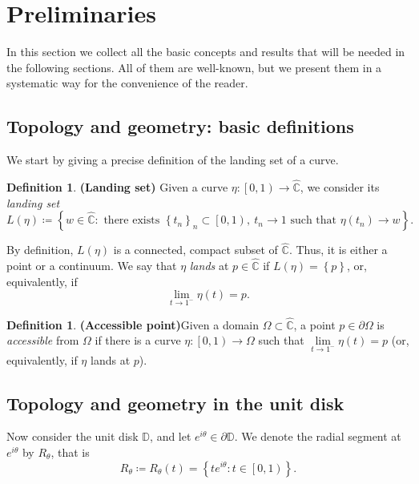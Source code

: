\documentclass[11pt,a4paper,reqno]{amsart}
\theoremstyle{plain}
\theoremstyle{definition}
\newtheorem{defi}[thm]{Definition}
\theoremstyle{plain}
\begin{document}
\section{Preliminaries}\label{sect-preliminaries}


In this section we collect all the basic concepts and results that will be needed in the following sections. All of them are well-known, but we present them in a systematic way for the convenience of the reader.

\subsection{Topology and geometry: basic definitions}\label{ssec:top-geom-disc}

We start by giving a precise definition of the landing set of a curve.
\begin{defi}{\bf (Landing set)}
	Given a curve $ \eta\colon \left[ 0,1\right) \to\widehat{\mathbb{C}} $, we consider its \textit{landing set} \[L(\eta)\coloneqq \left\lbrace w\in\widehat{\mathbb{C}}\colon \textrm{ there exists }\left\lbrace t_n\right\rbrace _n\subset\left[ 0,1\right) , \ t_n\to 1\textrm{ such that }\eta(t_n)\to w \right\rbrace .\]
\end{defi}

By definition, $ L(\eta) $ is a connected, compact subset of $ \widehat{\mathbb{C}} $. Thus, it is either a point or a continuum. We say that  $ \eta $ \textit{lands} at $ p\in\widehat{\mathbb{C}} $ if $ L(\eta)=\left\lbrace p\right\rbrace  $, or, equivalently, if  \[\lim\limits_{t\to 1^-}\eta(t)=p.\]

\begin{defi}{\bf (Accessible point)}\label{def-accessible-point}
	Given a domain $\Omega \subset\widehat{\mathbb{C}} $,
	a point $ p\in{\partial} \Omega $ is \textit{accessible} from $ \Omega $ if there is a curve $ \eta\colon \left[ 0,1\right) \to \Omega $ such that $ \lim\limits_{t\to 1^-} \eta(t)=p $ (or, equivalently, if $ \eta $ lands at $ p $).
\end{defi}

\subsection*{Topology and geometry in the unit disk}
Now consider the unit disk $ \mathbb{D} $, and let $ e^{i\theta}\in\partial \mathbb{D}$. We denote the radial segment at $ e^{i\theta}$ by $ R_\theta $, that is \[R_{\theta}\coloneqq R_\theta (t)= \left\lbrace t e^{i\theta}\colon t\in\left[ 0,1\right) \right\rbrace .\]
\end{document}
